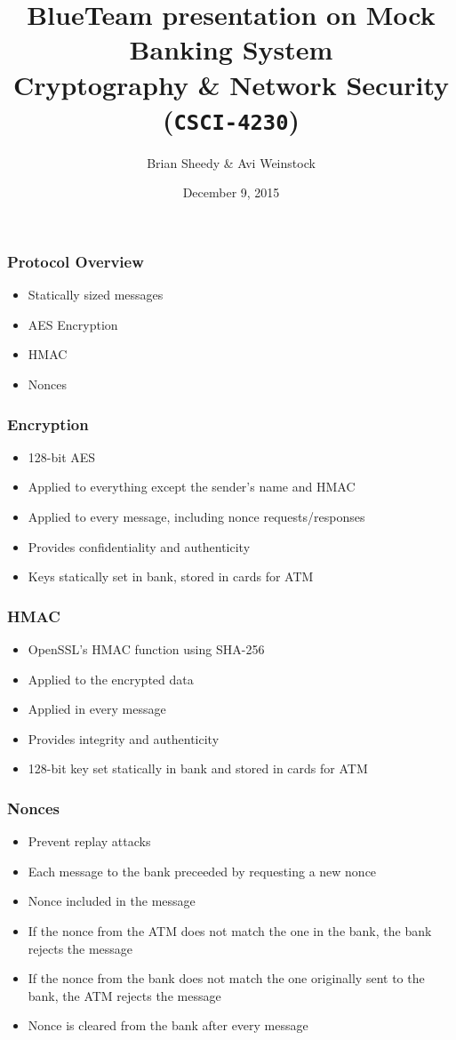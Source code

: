 \documentclass{beamer}
\title{BlueTeam presentation on Mock Banking System\\Cryptography \& Network Security (\Verb|CSCI-4230|)}
\date{December 9, 2015}
\author{Brian Sheedy \& Avi Weinstock}
\begin{document}
\maketitle

\begin{frame}[fragile]
\frametitle{Protocol Overview}
\begin{itemize}
\item Statically sized messages
\item AES Encryption
\item HMAC
\item Nonces
\end{itemize}
\end{frame}

\begin{frame}[fragile]
\frametitle{Encryption}
\begin{itemize}
\item 128-bit AES
\item Applied to everything except the sender's name and HMAC
\item Applied to every message, including nonce requests/responses
\item Provides confidentiality and authenticity
\item Keys statically set in bank, stored in cards for ATM
\end{itemize}
\end{frame}

\begin{frame}[fragile]
\frametitle{HMAC}
\begin{itemize}
\item OpenSSL's HMAC function using SHA-256
\item Applied to the encrypted data
\item Applied in every message
\item Provides integrity and authenticity
\item 128-bit key set statically in bank and stored in cards for ATM
\end{itemize}
\end{frame}

\begin{frame}[fragile]
\frametitle{Nonces}
\begin{itemize}
\item Prevent replay attacks
\item Each message to the bank preceeded by requesting a new nonce
\item Nonce included in the message
\item If the nonce from the ATM does not match the one in the bank, the bank rejects the message
\item If the nonce from the bank does not match the one originally sent to the bank, the ATM rejects the message
\item Nonce is cleared from the bank after every message
\end{itemize}
\end{frame}
\end{document}
